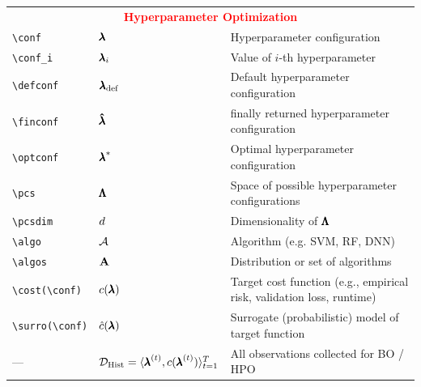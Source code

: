 \documentclass[]{article}
\begin{document}
\begin{table}[H]
\begin{tabular}{lll}
		\midrule
		\multicolumn{3}{c}{\textcolor{red}{\textbf{Hyperparameter Optimization}}}\\
		 \verb!\conf!  & $\pmb{\lambda}$ & Hyperparameter configuration\\
		 \verb!\conf_i!  & $\pmb{\lambda}_i$ & Value of $i$-th hyperparameter \\
		 \verb!\defconf!  & ${\pmb{\lambda}}_{\text{def}}$ & Default hyperparameter configuration\\
		 \verb!\finconf!  & $\pmb{\hat{\lambda}}$ & finally returned hyperparameter configuration\\
		 \verb!\optconf!  & ${\pmb{\lambda}}^*$ & Optimal hyperparameter configuration\\
		 \verb!\pcs!  & $\pmb{\Lambda}$ &  Space of possible hyperparameter configurations\\
		 \verb!\pcsdim!  & $d$ &  Dimensionality of $\pmb{\Lambda}$\\
		 \verb!\algo!  & $\mathcal{A}$ & Algorithm (e.g. SVM, RF, DNN) \\
		 \verb!\algos!  & $\mathbf{A}$ & Distribution or set of algorithms\\
		 \verb!\cost(\conf)!  & $c(\pmb{\lambda})$ & Target cost function (e.g., empirical risk, validation loss, runtime)\\
		 \verb!\surro(\conf)!  & $\hat{c}(\pmb{\lambda})$ & Surrogate (probabilistic) model of target function\\
		 ---  & $\mathcal{D}_{\text{Hist}} = \langle {\pmb{\lambda}}^{(t)}, c({\pmb{\lambda}}^{(t)}) \rangle_{t=1}^T$ &  All observations collected for BO / HPO\\
		

\end{tabular}
\end{table}
\end{document}
